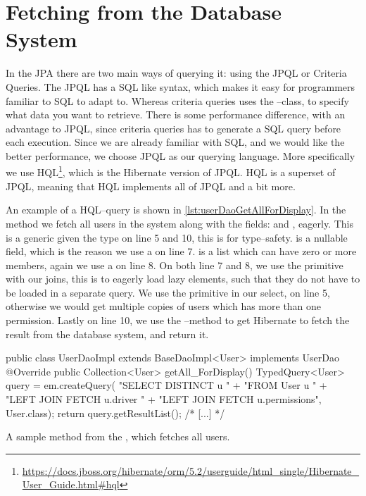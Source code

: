 \section{Fetching from the Database System}\label{subsec:fetchfromdb}
In the \ac{JPA} there are two main ways of querying it: using the \ac{JPQL} or Criteria Queries.
The \ac{JPQL} has a \ac{SQL} like syntax, which makes it easy for programmers familiar to \ac{SQL} to adapt to.
Whereas criteria queries uses the --class, to specify what data you want to retrieve.
There is some performance difference, with an advantage to \ac{JPQL}, since criteria queries has to generate a \ac{SQL} query before each execution\cite{jboss_fetchingstrategies}.
Since we are already familiar with \ac{SQL}, and we would like the better performance, we choose \ac{JPQL} as our querying language.
More specifically we use \ac{HQL}\footnote{\url{https://docs.jboss.org/hibernate/orm/5.2/userguide/html_single/Hibernate_User_Guide.html\#hql}}, which is the Hibernate version of \ac{JPQL}.
\ac{HQL} is a superset of \ac{JPQL}, meaning that \ac{HQL} implements all of \ac{JPQL} and a bit more.

\bigskip
An example of a \ac{HQL}--query is shown in \cref{lst:userDaoGetAllForDisplay}.
In the method  we fetch all users in the system along with the fields:  and , eagerly.
This is a  generic given the type  on line 5 and 10, this is for type--safety.
 is a nullable field, which is the reason we use a  on line 7.
 is a list which can have zero or more members, again we use a  on line 8.
On both line 7 and 8, we use the  primitive with our joins,
this is to eagerly load lazy elements, such that they do not have to be loaded in a separate query.
We use the  primitive in our select, on line 5,
otherwise we would get multiple copies of users which has more than one permission.
Lastly on line 10, we use the --method to get Hibernate to fetch the result from the database system, and return it.
\begin{listing}
    \begin{java2}
public class UserDaoImpl extends BaseDaoImpl<User> implements UserDao {
    @Override
    public Collection<User> getAll_ForDisplay() {
        TypedQuery<User> query = em.createQuery(
            "SELECT DISTINCT u " +
                "FROM User u " +
                "LEFT JOIN FETCH u.driver " +
                "LEFT JOIN FETCH u.permissions",
            User.class);
        return query.getResultList();
    }
    /* [...] */
}
    \end{java2}
    \caption{A sample method from the , which fetches all users.}\label{lst:userDaoGetAllForDisplay}
\end{listing}

